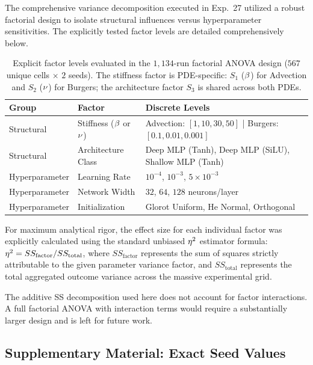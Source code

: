 The comprehensive variance decomposition executed in Exp.~27 utilized a robust factorial design to isolate structural influences versus hyperparameter sensitivities. The explicitly tested factor levels are detailed comprehensively below.

\begin{table}[htpb]
    \centering
    \caption{Explicit factor levels evaluated in the $1{,}134$-run factorial ANOVA design ($567$ unique cells $\times$ $2$ seeds). The stiffness factor is PDE-specific: $S_1$ ($\beta$) for Advection and $S_2$ ($\nu$) for Burgers; the architecture factor $S_3$ is shared across both PDEs.}
    \label{tab:app_anova}
    \begin{tabular}{@{}lll@{}}
        \toprule
        Group & Factor & Discrete Levels \\
        \midrule
        Structural & Stiffness ($\beta$ or $\nu$) & Advection: $[1, 10, 30, 50]$ | Burgers: $[0.1, 0.01, 0.001]$ \\
        Structural & Architecture Class & Deep MLP (Tanh), Deep MLP (SiLU), Shallow MLP (Tanh) \\
        Hyperparameter & Learning Rate & $10^{-4}$, $10^{-3}$, $5\times10^{-3}$ \\
        Hyperparameter & Network Width & $32$, $64$, $128$ neurons/layer \\
        Hyperparameter & Initialization & Glorot Uniform, He Normal, Orthogonal \\
        \bottomrule
    \end{tabular}
\end{table}

For maximum analytical rigor, the effect size for each individual factor was explicitly calculated using the standard unbiased $\eta^2$ estimator formula: $\eta^2 = SS_{\text{factor}} / SS_{\text{total}}$, where $SS_{\text{factor}}$ represents the sum of squares strictly attributable to the given parameter variance factor, and $SS_{\text{total}}$ represents the total aggregated outcome variance across the massive experimental grid. 

The additive SS decomposition used here does not account for factor interactions. A full factorial ANOVA with interaction terms would require a substantially larger design and is left for future work.

\subsection{Supplementary Material: Exact Seed Values}
\label{app:seeds}


